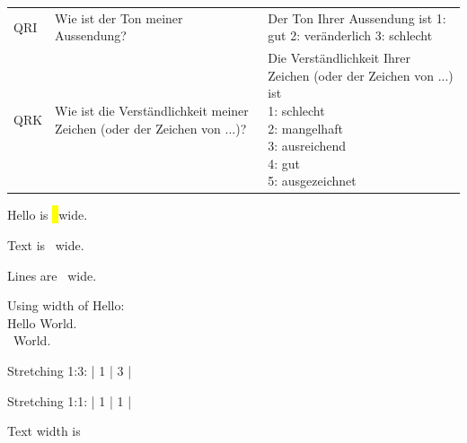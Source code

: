 \documentclass[draft]{article}
\begin{document}
\newcommand{\wrap}[1]{\begin{minipage}[t]{5.5cm}#1\end{minipage}}
\begin{xtabular}{l p{5cm} p{6cm}}
QRI & Wie ist der Ton meiner Aussendung? & Der Ton Ihrer Aussendung ist 1: gut 2: veränderlich 3: schlecht \\
QRK & Wie ist die Verständlichkeit meiner Zeichen (oder der Zeichen von ...)? & \wrap{Die Verständlichkeit Ihrer Zeichen (oder der Zeichen von ...) ist\\ 1: schlecht\\ 2: mangelhaft\\ 3: ausreichend\\ 4: gut\\ 5: ausgezeichnet} \\
\end{xtabular}


\newlength{\hl}
\settowidth{\hl}{Hello}
Hello is \the\hl\ wide.

Text is \the\textwidth\ wide.

\setlength{\parskip}{\parskip+6pt}

Lines are \the\linewidth\ wide.

Using width of Hello:\\
Hello World.\\
\hspace*{\hl}\ World.

Stretching 1:3: |  1  |  3  |

Stretching 1:1: | \hfill 1 \hfill | \hfill 1 \hfill |

\newsavebox{\myBox}

\newlength{\imgW}
\settowidth{\imgW}{\usebox{\myBox}}

Text width is \the\imgW

\end{document}
